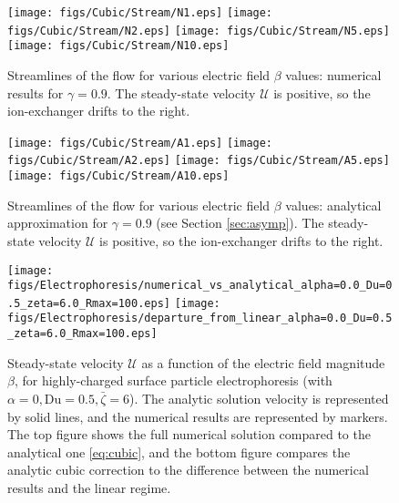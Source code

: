 \documentclass[MSc,beforeExam]{iitcsthesis}
\newcommand\cU{\mathscr{U}}
\begin{document}
\begin{figure}
    \begin{center}
	\texttt{[image: figs/Cubic/Stream/N1.eps]}
	\texttt{[image: figs/Cubic/Stream/N2.eps]}
	\texttt{[image: figs/Cubic/Stream/N5.eps]}
	\texttt{[image: figs/Cubic/Stream/N10.eps]}
        \caption[Ion exchanger streamlines -- numerical results]{
        Streamlines of the flow for various electric field $\beta$ values: 
        numerical results for $\gamma = 0.9$.  
        The steady-state velocity $\cU$ is positive, so the
        ion-exchanger drifts to the right. }
    \label{fig:Vortex1}
    \end{center}
\end{figure}

\begin{figure}
    \begin{center}
	\texttt{[image: figs/Cubic/Stream/A1.eps]}
	\texttt{[image: figs/Cubic/Stream/A2.eps]}
	\texttt{[image: figs/Cubic/Stream/A5.eps]}
	\texttt{[image: figs/Cubic/Stream/A10.eps]}
        \caption[Ion exchanger streamlines -- analytical results]{
        Streamlines of the flow for various electric field $\beta$ values: 
        analytical approximation for $\gamma = 0.9$ (see Section \ref{sec:asymp}).
        The steady-state velocity $\cU$ is positive, so the
        ion-exchanger drifts to the right.}
    \label{fig:Vortex2}
    \end{center}
\end{figure}

\begin{figure}
    \begin{center}
    \texttt{[image: figs/Electrophoresis/numerical\_vs\_analytical\_alpha=0.0\_Du=0.5\_zeta=6.0\_Rmax=100.eps]}
    \texttt{[image: figs/Electrophoresis/departure\_from\_linear\_alpha=0.0\_Du=0.5\_zeta=6.0\_Rmax=100.eps]}
        \caption[Highly-charged surface particle steady-state velocity]{
        Steady-state velocity $\cU$ as a function of the 
        electric field magnitude $\beta$, for highly-charged surface particle
        electrophoresis (with $\alpha = 0, \text{Du} = 0.5, \bar\zeta = 6$).
        The analytic solution velocity is represented by solid lines, 
        and the numerical results are represented by markers.
        The top figure shows the full numerical solution 
        compared to the analytical one \eqref{eq:cubic}, and
        the bottom figure compares the analytic cubic correction \cite{schnitzer2012cubic} 
        to the difference between the numerical results and the linear regime.}
	    \label{fig:Electrophoresis1}
    \end{center}
\end{figure}
\end{document}
